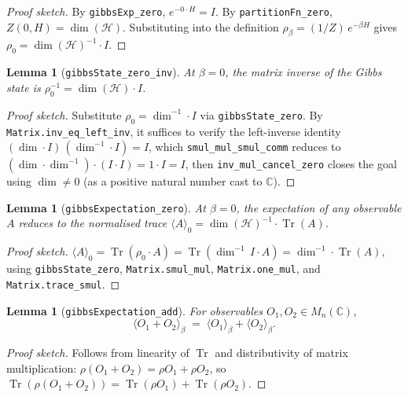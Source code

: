 \documentclass[a4paper,11pt]{article}
\newtheorem{lemma}[theorem]{Lemma}
\begin{document}
\begin{proof}[Proof sketch]
By \texttt{gibbsExp\_zero}, $e^{-0\cdot H} = I$.  By
\texttt{partitionFn\_zero}, $Z(0, H) = \dim(\mathcal{H})$.  Substituting
into the definition $\rho_\beta = (1/Z)\,e^{-\beta H}$ gives
$\rho_0 = \dim(\mathcal{H})^{-1} \cdot I$.
\end{proof}

\begin{lemma}[\texttt{gibbsState\_zero\_inv}]
At $\beta = 0$, the matrix inverse of the Gibbs state is
$\rho_0^{-1} = \dim(\mathcal{H}) \cdot I$.
\end{lemma}

\begin{proof}[Proof sketch]
Substitute $\rho_0 = \dim^{-1} \cdot I$ via \texttt{gibbsState\_zero}.
By \texttt{Matrix.inv\_eq\_left\_inv}, it suffices to verify the
left-inverse identity
$(\dim \cdot I)\,(\dim^{-1} \cdot I) = I$, which
\texttt{smul\_mul\_smul\_comm} reduces to
$(\dim \cdot \dim^{-1}) \cdot (I \cdot I) = 1 \cdot I = I$, then
\texttt{inv\_mul\_cancel\_zero} closes the goal using
$\dim \neq 0$ (as a positive natural number cast to $\mathbb{C}$).
\end{proof}

\begin{lemma}[\texttt{gibbsExpectation\_zero}]
At $\beta = 0$, the expectation of any observable $A$ reduces to the
normalised trace
$\langle A \rangle_0 = \dim(\mathcal{H})^{-1} \cdot \operatorname{Tr}(A)$.
\end{lemma}

\begin{proof}[Proof sketch]
$\langle A \rangle_0 = \operatorname{Tr}(\rho_0 \cdot A)
= \operatorname{Tr}(\dim^{-1}\,I \cdot A)
= \dim^{-1} \cdot \operatorname{Tr}(A)$,
using \texttt{gibbsState\_zero}, \texttt{Matrix.smul\_mul},
\texttt{Matrix.one\_mul}, and \texttt{Matrix.trace\_smul}.
\end{proof}

\begin{lemma}[\texttt{gibbsExpectation\_add}]
For observables $O_1, O_2 \in M_n(\mathbb{C})$,
\[
  \langle O_1 + O_2 \rangle_\beta
  \;=\;
  \langle O_1 \rangle_\beta + \langle O_2 \rangle_\beta.
\]
\end{lemma}

\begin{proof}[Proof sketch]
Follows from linearity of $\operatorname{Tr}$ and distributivity of
matrix multiplication: $\rho(O_1 + O_2) = \rho O_1 + \rho O_2$, so
$\operatorname{Tr}(\rho(O_1+O_2))
 = \operatorname{Tr}(\rho O_1) + \operatorname{Tr}(\rho O_2)$.
\end{proof}
\end{document}
